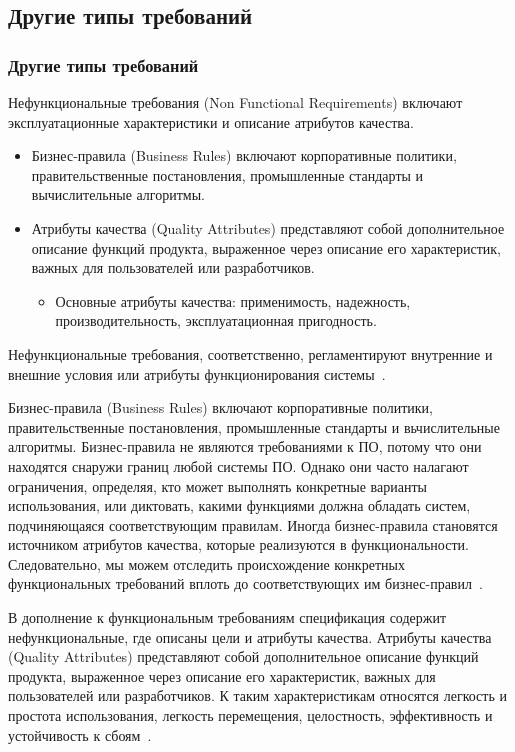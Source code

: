 \documentclass{../industrial-development}
\begin{document}
\subsection{Другие типы требований}
\begin{frame} \frametitle{Другие типы требований}
  \begin{block}{}
\alert{Нефункциональные требования (Non Functional Requirements)}	включают эксплуатационные характеристики и описание атрибутов качества.
  \end{block}
	\begin{itemize}
\item \alert{Бизнес-правила (Business Rules)}	включают корпоративные политики, правительственные постановления, промышленные стандарты и вычислительные алгоритмы.
\item \alert{Атрибуты качества (Quality Attributes)} представляют собой дополнительное описание функций продукта, выраженное через описание его характеристик, важных для пользователей или разработчиков.
	\begin{itemize}
	\item Основные атрибуты качества: применимость,  надежность, производительность, эксплуатационная пригодность.
	\end{itemize}
	\end{itemize}
		\end{frame}
		
\lecturenotes

Нефункциональные требования, соответственно, регламентируют внутренние и внешние условия или атрибуты функционирования системы~\cite[с.~10]{Maglinec}.

\alert{Бизнес-правила (Business Rules)} включают корпоративные политики, правительственные постановления, промышленные стандарты и вьчислительные алгоритмы. Бизнес-правила не являются требованиями к ПО, потому что они находятся снаружи границ любой системы ПО. Однако они часто налагают ограничения, определяя, кто может выполнять конкретные варианты использования, или диктовать, какими функциями должна обладать систем, подчиняющаяся соответствующим правилам. Иногда бизнес-правила становятся источником атрибутов качества, которые реализуются в функциональности. Следовательно, мы можем отследить происхождение конкретных функциональных требований вплоть до соответствующих им бизнес-правил~\cite[с.~9]{Wiegers}.

В дополнение к функциональным требованиям спецификация содержит нефункциональные, где описаны цели и атрибуты качества. \alert{Атрибуты качества (Quality Attributes)} представляют собой дополнительное описание функций продукта, выраженное через описание его характеристик, важных для пользователей или разработчиков. К таким
характеристикам относятся легкость и простота использования, легкость перемещения, целостность, эффективность и устойчивость к сбоям~\cite[с.~10]{Wiegers}.
\end{document}
